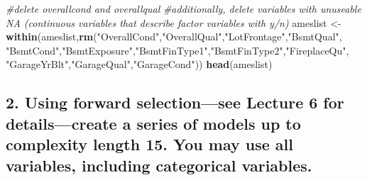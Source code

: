 \documentclass[]{article}
\newenvironment{Shaded}{\begin{snugshade}}{\end{snugshade}}
\newcommand{\CommentTok}[1]{\textcolor[rgb]{0.56,0.35,0.01}{\textit{#1}}}
\newcommand{\KeywordTok}[1]{\textcolor[rgb]{0.13,0.29,0.53}{\textbf{#1}}}
\newcommand{\NormalTok}[1]{#1}
\newcommand{\StringTok}[1]{\textcolor[rgb]{0.31,0.60,0.02}{#1}}
\begin{document}
\begin{Shaded}
\begin{Highlighting}[]
\CommentTok{#delete overallcond and overallqual}
\CommentTok{#additionally, delete variables with unuseable NA (continuous variables that describe factor variables with y/n)}
\NormalTok{ameslist <-}\StringTok{ }\KeywordTok{within}\NormalTok{(ameslist,}\KeywordTok{rm}\NormalTok{(}\StringTok{"OverallCond"}\NormalTok{,}\StringTok{"OverallQual"}\NormalTok{,}\StringTok{"LotFrontage"}\NormalTok{,}\StringTok{"BsmtQual"}\NormalTok{,}
                               \StringTok{"BsmtCond"}\NormalTok{,}\StringTok{"BsmtExposure"}\NormalTok{,}\StringTok{"BsmtFinType1"}\NormalTok{,}\StringTok{"BsmtFinType2"}\NormalTok{,}\StringTok{"FireplaceQu"}\NormalTok{,}
                               \StringTok{"GarageYrBlt"}\NormalTok{,}\StringTok{"GarageQual"}\NormalTok{,}\StringTok{"GarageCond"}\NormalTok{))}
\KeywordTok{head}\NormalTok{(ameslist)}
\end{Highlighting}
\end{Shaded}

\hypertarget{using-forward-selectionsee-lecture-6-for-detailscreate-a-series-of-models-up-to-complexity-length-15.-you-may-use-all-variables-including-categorical-variables.}{%
\subsection{2. Using forward selection---see Lecture 6 for
details---create a series of models up to complexity length 15. You may
use all variables, including categorical
variables.}\label{using-forward-selectionsee-lecture-6-for-detailscreate-a-series-of-models-up-to-complexity-length-15.-you-may-use-all-variables-including-categorical-variables.}}
\end{document}
